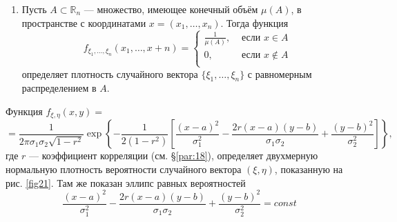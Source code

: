 \begin{example}\-
\label{ex:15.8}
	\begin{enumerate}
		\item Пусть $A \subset \mathbb{R}_n$ — множество, имеющее конечный
			объём $\mu(A)$, в пространстве с координатами $x = (x_1,\dots, x_n)$. Тогда функция
			\begin{equation*}
				f_{\xi_1,\dots,\xi_n}(x_1,\dots,x+n)=
				\begin{cases}
					\frac{1}{\mu(A)}, &\text{ если } x\in A\\
					0, &\text{ если } x\notin A\\
				\end{cases}
			\end{equation*}
			определяет плотность случайного вектора $\{\xi_1,\dots,\xi_n\}$ с равномерным распределением в $A$.
	\end{enumerate}
		\item Функция $f_{\xi,\eta}(x,y)=$
		\begin{equation*}
			=\frac{1}{2\pi\sigma_1\sigma_2\sqrt{1-r^2}}\exp
			\left\{
				-\frac{1}{2(1-r^2)}
			\left[
				\frac{(x-a)^2}{\sigma_1^2}-\frac{2r(x-a)(y-b)}{\sigma_1\sigma_2}+\frac{(y-b)^2}{\sigma_2^2} 
			\right] 
			\right\},
		\end{equation*}
		где $r$ — коэффициент корреляции (см. \S\ref{par:18}), определяет двухмерную нормальную плотность вероятности случайного вектора $(\xi, \eta)$, показанную на рис. \ref{fig21}. Там же показан эллипс равных вероятностей
		\begin{equation*}
			\frac{(x-a)^2}{\sigma_1^2}-\frac{2r(x-a)(y-b)}{\sigma_1\sigma_2}+\frac{(y-b)^2}{\sigma_2^2}=const
		\end{equation*}
\begin{figure}[H]
	\centering

\end{figure}
\end{example}
